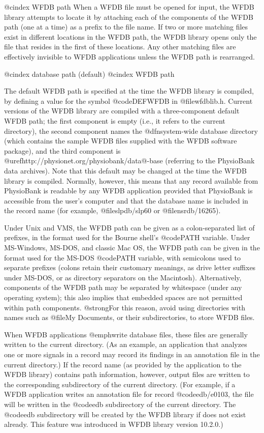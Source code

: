 {@cindex WFDB path
When a WFDB file must be opened for input, the WFDB library attempts to
locate it by attaching each of the components of the WFDB path (one at a
time) as a prefix to the file name.  If two or more matching files exist
in different locations in the WFDB path, the WFDB library opens only the
file that resides in the first of these locations.  Any other matching
files are effectively invisible to WFDB applications unless the WFDB
path is rearranged.

@cindex database path (default)
@cindex WFDB path

The default WFDB path is specified at the time the WFDB library is
compiled, by defining a value for the symbol @code{DEFWFDB} in
@file{wfdblib.h}.  Current versions of the WFDB library are compiled
with a three-component default WFDB path; the first component is empty
(i.e., it refers to the current directory), the second component names
the @dfn{system-wide database directory} (which contains the sample WFDB
files supplied with the WFDB software package), and the third component
is @uref{http://physionet.org/physiobank/data@-base} (referring to the
PhysioBank data archives).  Note that this default may be changed at the
time the WFDB library is compiled.  Normally, however, this means that
any record available from PhysioBank is readable by any WFDB application
provided that PhysioBank is accessible from the user's computer and that
the database name is included in the record name (for example,
@file{slpdb/slp60} or @file{nsrdb/16265}).

Under Unix and VMS, the WFDB path can be given as a colon-separated list
of prefixes, in the format used for the Bourne shell's @code{PATH}
variable.  Under MS-Windows, MS-DOS, and classic Mac OS, the WFDB path can be
given in the format used for the MS-DOS @code{PATH} variable, with
semicolons used to separate prefixes (colons retain their customary
meanings, as drive letter suffixes under MS-DOS, or as directory
separators on the Macintosh).  Alternatively, components of the WFDB
path may be separated by whitespace (under any operating system); this
also implies that embedded spaces are not permitted within path
components.  @strong{For this reason, avoid using directories with names
such as @file{My Documents}, or their subdirectories, to store WFDB files.}

When WFDB applications @emph{write} database files, these files are
generally written to the current directory.  (As an example, an
application that analyzes one or more signals in a record may record its
findings in an annotation file in the current directory.)  If the record
name (as provided by the application to the WFDB library) contains path
information, however, output files are written to the corresponding
subdirectory of the current directory.  (For example, if a WFDB
application writes an annotation file for record @code{edb/e0103}, the
file will be written in the @code{edb} subdirectory of the current
directory.  The @code{edb} subdirectory will be created by the WFDB
library if does not exist already.  This feature was introduced in WFDB
library version 10.2.0.)

}
